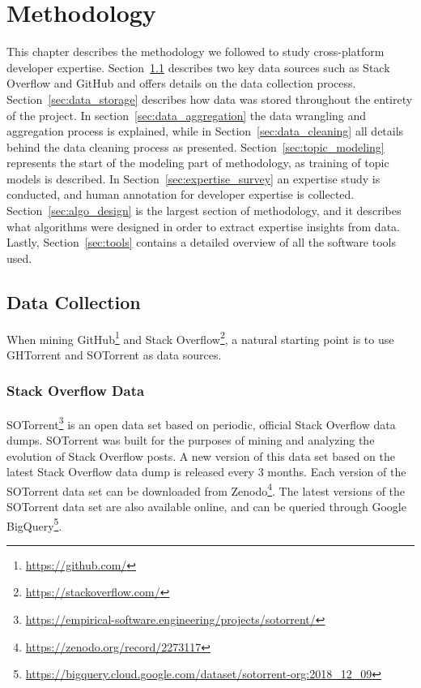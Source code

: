 \chapter{Methodology\label{chap:methodology}}

This chapter describes the methodology we followed to study cross-platform developer expertise. Section~\ref{sec:data_collection} describes two key data sources such as Stack Overflow and GitHub and offers details on the data collection process. Section~\ref{sec:data_storage} describes how data was stored throughout the entirety of the project. In section~\ref{sec:data_aggregation} the data wrangling and aggregation process is explained, while in Section~\ref{sec:data_cleaning} all details behind the data cleaning process as presented. Section~\ref{sec:topic_modeling} represents the start of the modeling part of methodology, as training of topic models is described. In Section~\ref{sec:expertise_survey} an expertise study is conducted, and human annotation for developer expertise is collected. 
Section~\ref{sec:algo_design} is the largest section of methodology, and it describes what algorithms were designed in order to extract expertise insights from data. Lastly, Section~\ref{sec:tools} contains a detailed overview of all the software tools used.

\section{Data Collection} \label{sec:data_collection}

    When mining GitHub\footnote{\url{https://github.com/}} and Stack Overflow\footnote{\url{https://stackoverflow.com/}}, a natural starting point is to use GHTorrent \cite{gousios2013ghtorent} and SOTorrent \cite{baltes2018sotorrent} as data sources.
    
    \subsection{Stack Overflow Data}
    
        SOTorrent\footnote{\label{SOTorrent}\url{https://empirical-software.engineering/projects/sotorrent/}} is an open data set based on periodic, official Stack Overflow data dumps. SOTorrent was built for the purposes of mining and analyzing the evolution of Stack Overflow posts. A new version of this data set based on the latest Stack Overflow data dump is released every 3 months. Each version of the SOTorrent data set can be downloaded from Zenodo\footnote{\label{SOTorrent_Zenodo} \url{https://zenodo.org/record/2273117}}. The latest versions of the SOTorrent data set are also available online, and can be queried through Google BigQuery\footnote{\label{BigQuery} \url{https://bigquery.cloud.google.com/dataset/sotorrent-org:2018_12_09}}.
        
